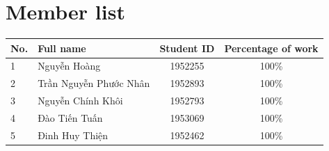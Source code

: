 \documentclass[a4paper]{article}
\numberwithin{equation}{section}
\begin{document}
\section*{Member list}
\begin{center}
  \begin{tabular}{llcc}
    \toprule
    \textbf{No.} & \textbf{Full name}     & \textbf{Student ID} & \textbf{Percentage of work} \\
    \midrule
    1            & Nguyễn Hoàng           & 1952255             & 100\%                       \\
    2            & Trần Nguyễn Phước Nhân & 1952893             & 100\%                       \\
    3            & Nguyễn Chính Khôi      & 1952793             & 100\%                       \\
    4            & Đào Tiến Tuấn          & 1953069             & 100\%                       \\
    5            & Đinh Huy Thiện         & 1952462             & 100\%                       \\
    \bottomrule
  \end{tabular}
\end{center}

\newpage
\tableofcontents
\newpage






\end{document}

